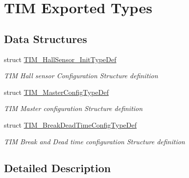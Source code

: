 \hypertarget{group___t_i_m_ex___exported___types}{}\section{T\+IM Exported Types}
\label{group___t_i_m_ex___exported___types}
\subsection*{Data Structures}
\begin{DoxyCompactItemize}
\item 
struct \mbox{\hyperlink{struct_t_i_m___hall_sensor___init_type_def}{T\+I\+M\+\_\+\+Hall\+Sensor\+\_\+\+Init\+Type\+Def}}
\begin{DoxyCompactList}\small\item\em T\+IM Hall sensor Configuration Structure definition ~\newline
 \end{DoxyCompactList}\item 
struct \mbox{\hyperlink{struct_t_i_m___master_config_type_def}{T\+I\+M\+\_\+\+Master\+Config\+Type\+Def}}
\begin{DoxyCompactList}\small\item\em T\+IM Master configuration Structure definition ~\newline
 \end{DoxyCompactList}\item 
struct \mbox{\hyperlink{struct_t_i_m___break_dead_time_config_type_def}{T\+I\+M\+\_\+\+Break\+Dead\+Time\+Config\+Type\+Def}}
\begin{DoxyCompactList}\small\item\em T\+IM Break and Dead time configuration Structure definition ~\newline
 \end{DoxyCompactList}\end{DoxyCompactItemize}


\subsection{Detailed Description}
